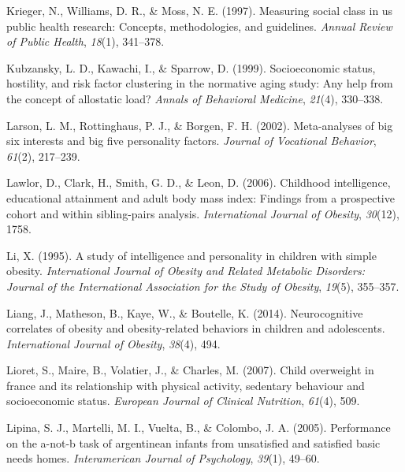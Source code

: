 \documentclass[man]{apa6}
\begin{document}
\leavevmode\hypertarget{ref-krieger1997measuring}{}%
Krieger, N., Williams, D. R., \& Moss, N. E. (1997). Measuring social class in us public health research: Concepts, methodologies, and guidelines. \emph{Annual Review of Public Health}, \emph{18}(1), 341--378.

\leavevmode\hypertarget{ref-kubzansky1999socioeconomic}{}%
Kubzansky, L. D., Kawachi, I., \& Sparrow, D. (1999). Socioeconomic status, hostility, and risk factor clustering in the normative aging study: Any help from the concept of allostatic load? \emph{Annals of Behavioral Medicine}, \emph{21}(4), 330--338.

\leavevmode\hypertarget{ref-larson2002meta}{}%
Larson, L. M., Rottinghaus, P. J., \& Borgen, F. H. (2002). Meta-analyses of big six interests and big five personality factors. \emph{Journal of Vocational Behavior}, \emph{61}(2), 217--239.

\leavevmode\hypertarget{ref-lawlor2006childhood}{}%
Lawlor, D., Clark, H., Smith, G. D., \& Leon, D. (2006). Childhood intelligence, educational attainment and adult body mass index: Findings from a prospective cohort and within sibling-pairs analysis. \emph{International Journal of Obesity}, \emph{30}(12), 1758.

\leavevmode\hypertarget{ref-li1995study}{}%
Li, X. (1995). A study of intelligence and personality in children with simple obesity. \emph{International Journal of Obesity and Related Metabolic Disorders: Journal of the International Association for the Study of Obesity}, \emph{19}(5), 355--357.

\leavevmode\hypertarget{ref-liang2014neurocognitive}{}%
Liang, J., Matheson, B., Kaye, W., \& Boutelle, K. (2014). Neurocognitive correlates of obesity and obesity-related behaviors in children and adolescents. \emph{International Journal of Obesity}, \emph{38}(4), 494.

\leavevmode\hypertarget{ref-lioret2007child}{}%
Lioret, S., Maire, B., Volatier, J., \& Charles, M. (2007). Child overweight in france and its relationship with physical activity, sedentary behaviour and socioeconomic status. \emph{European Journal of Clinical Nutrition}, \emph{61}(4), 509.

\leavevmode\hypertarget{ref-lipina2005performance}{}%
Lipina, S. J., Martelli, M. I., Vuelta, B., \& Colombo, J. A. (2005). Performance on the a-not-b task of argentinean infants from unsatisfied and satisfied basic needs homes. \emph{Interamerican Journal of Psychology}, \emph{39}(1), 49--60.
\end{document}
